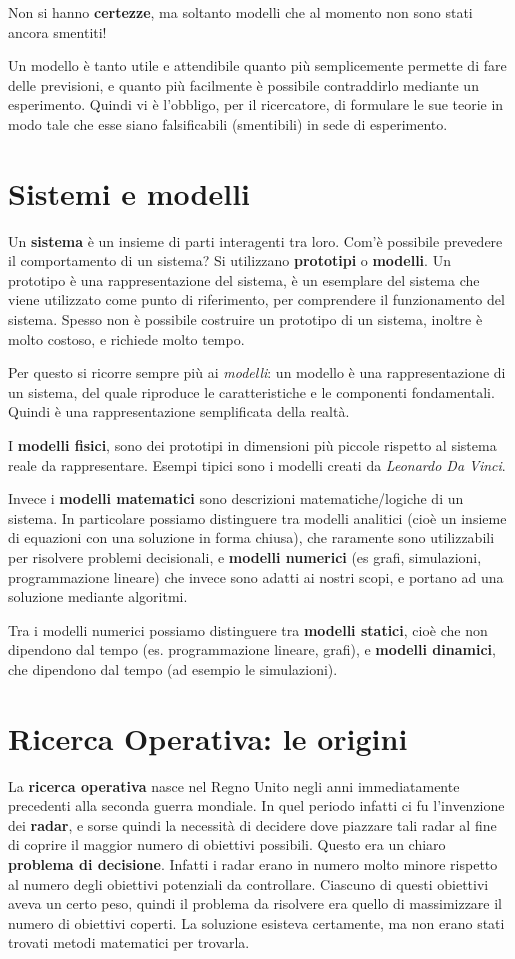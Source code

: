 \documentclass[11pt]{book}
\begin{document}
Non si hanno {\bf certezze}, ma soltanto modelli che al momento non
sono stati ancora smentiti!

Un modello \`e tanto utile e attendibile quanto pi\`u semplicemente
permette di fare delle previsioni, e quanto pi\`u facilmente \`e
possibile contraddirlo mediante un esperimento.  Quindi vi \`e
l'obbligo, per il ricercatore, di formulare le sue teorie in modo tale
che esse siano falsificabili (smentibili) in sede di esperimento.

\section{Sistemi e modelli}
Un {\bf sistema} \`e un insieme di parti interagenti tra loro. Com'\`e
possibile prevedere il comportamento di un sistema? Si utilizzano {\bf
  prototipi} o {\bf modelli}. Un prototipo \`e una rappresentazione del
sistema, \`e un esemplare del sistema che viene utilizzato come punto
di riferimento, per comprendere il funzionamento del sistema. Spesso
non \`e possibile costruire un prototipo di un sistema, inoltre \`e
molto costoso, e richiede molto tempo.

Per questo si ricorre sempre pi\`u ai {\em modelli}: un modello \`e una
rappresentazione di un sistema, del quale riproduce le caratteristiche
e le componenti fondamentali. Quindi \`e una rappresentazione
semplificata della realt\`a.

I {\bf modelli fisici}, sono dei prototipi in dimensioni pi\`u piccole
rispetto al sistema reale da rappresentare. Esempi tipici sono i
modelli creati da {\em Leonardo Da Vinci}.

Invece i {\bf modelli matematici} sono descrizioni matematiche/logiche
di un sistema. In particolare possiamo distinguere tra modelli
analitici (cio\`e un insieme di equazioni con una soluzione in forma
chiusa), che raramente sono utilizzabili per risolvere problemi
decisionali, e {\bf modelli numerici} (es grafi, simulazioni,
programmazione lineare) che invece sono adatti ai nostri scopi, e
portano ad una soluzione mediante algoritmi.

Tra i modelli numerici possiamo distinguere tra {\bf modelli statici},
cio\`e che non dipendono dal tempo (es. programmazione lineare, grafi),
e {\bf modelli dinamici}, che dipendono dal tempo (ad esempio le
simulazioni).

\section{Ricerca Operativa: le origini}
La {\bf ricerca operativa} nasce nel Regno Unito negli anni
immediatamente precedenti alla seconda guerra mondiale. In quel
periodo infatti ci fu l'invenzione dei {\bf radar}, e sorse quindi la
necessit\`a di decidere dove piazzare tali radar al fine di coprire il
maggior numero di obiettivi possibili. Questo era un chiaro {\bf
  problema di decisione}. Infatti i radar erano in numero molto minore
rispetto al numero degli obiettivi potenziali da controllare. Ciascuno
di questi obiettivi aveva un certo peso, quindi il problema da
risolvere era quello di massimizzare il numero di obiettivi coperti.
La soluzione esisteva certamente, ma non erano stati trovati metodi
matematici per trovarla. 
\end{document}
